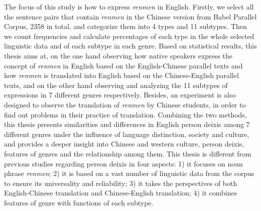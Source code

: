 \documentclass[degree=bachelor,language=english]{thuthesis}
\begin{document}
\begin{abstract*}
  The focus of this study is how to express \emph{renmen} in English. Firstly, we select all the sentence pairs that contain \emph{renmen} in the Chinese version from Babel Parallel Corpus, 2358 in total, and categorize them into 4 types and 11 subtypes. Then we count frequencies and calculate percentages of each type in the whole selected linguistic data and of each subtype in each genre. Based on statistical results, this thesis aims at, on the one hand observing how native speakers express the concept of \emph{renmen} in English based on the English-Chinese parallel texts and how \emph{renmen} is translated into English based on the Chinese-English parallel texts, and on the other hand observing and analyzing the 11 subtypes of expressions in 7 different genres respectively. Besides, an experiment is also designed to observe the translation of \emph{renmen} by Chinese students, in order to find out problems in their practice of translation. Combining the two methods, this thesis presents similarities and differences in English person deixis among 7 different genres under the influence of language distinction, society and culture, and provides a deeper insight into Chinese and western culture, person deixis, features of genres and the relationship among them. This thesis is different from previous studies regarding person deixis in four aspects: 1) it focuses on noun phrase \emph{renmen}; 2) it is based on a vast number of linguistic data from the corpus to ensure its universality and reliability; 3) it takes the perspectives of both English-Chinese translation and Chinese-English translation; 4) it combines features of genre with functions of each subtype.

\end{abstract*}

\tableofcontents
\end{document}
